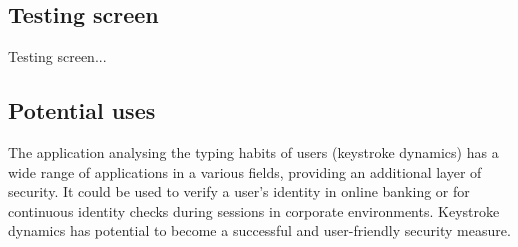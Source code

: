 \subsection{Testing screen}

Testing screen... 

\subsection{Potential uses}
The application analysing the typing habits of users (keystroke dynamics) has a wide range of applications in a various fields, providing an additional layer of security. It could be used to verify a user's identity in online banking or for continuous identity checks during sessions in corporate environments. Keystroke dynamics has potential to become a successful and user-friendly security measure.

